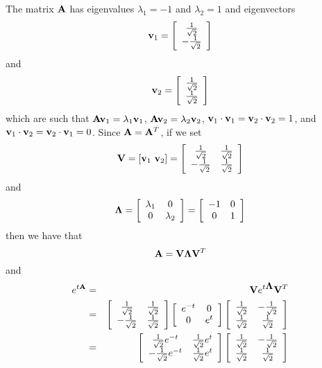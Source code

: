 \begin{solution}
\begin{enumerate}
The matrix ${\bf A}$ has eigenvalues $\lambda_1 = -1$ and $\lambda_2 = 1$ and eigenvectors
\[
{\bf v}_1 = \left[\begin{array}{c}{1\over\sqrt{2}} \\ -{1\over\sqrt{2}}\end{array}\right]
\]
and
\[
{\bf v}_2 = \left[\begin{array}{c}{1\over\sqrt{2}} \\ {1\over\sqrt{2}}\end{array}\right]
\]
which are such that ${\bf A}{\bf v}_1=\lambda_1{\bf v}_1$, ${\bf A}{\bf v}_2=\lambda_2{\bf v}_2$, ${\bf v}_1\cdot{\bf v}_1={\bf v}_2\cdot{\bf v}_2=1$,  and ${\bf v}_1\cdot{\bf v}_2={\bf v}_2\cdot{\bf v}_1=0$. Since ${\bf A}={\bf A}^T$, if we set
\[
\BV = [\Bv_1\ \Bv_2]=\left[\begin{array}{cc}{1\over\sqrt{2}} & {1\over\sqrt{2}} \\ -{1\over\sqrt{2}} & {1\over\sqrt{2}}\end{array}\right]
\]
and
\[
\mbox{\boldmath$\Lambda$} = \left[\begin{array}{cc}\lambda_1 & 0 \\ 0 & \lambda_2\end{array}\right]=\left[\begin{array}{cc}-1 & 0 \\ 0 & 1\end{array}\right]
\]
then we have that
\[
{\bf A} = {\bf V}\mbox{\boldmath$\Lambda$}{\bf V}^T
\]
and
\begin{eqnarray*}
e^{t\BA} &=& \BV e^{t\BLambda} \BV^T
\\
&=& \left[\begin{array}{cc}{1\over\sqrt{2}} & {1\over\sqrt{2}} \\ -{1\over\sqrt{2}} & {1\over\sqrt{2}}\end{array}\right] \left[\begin{array}{cc}e^{-t} & 0 \\ 0 & e^{t}\end{array}\right] \left[\begin{array}{cc}{1\over\sqrt{2}} & -{1\over\sqrt{2}} \\ {1\over\sqrt{2}} & {1\over\sqrt{2}}\end{array}\right]
\\
&=& \left[\begin{array}{cc}{1\over\sqrt{2}}e^{-t} & {1\over\sqrt{2}}e^t \\ -{1\over\sqrt{2}}e^{-t} & {1\over\sqrt{2}}e^t\end{array}\right] \left[\begin{array}{cc}{1\over\sqrt{2}} & -{1\over\sqrt{2}} \\ {1\over\sqrt{2}} & {1\over\sqrt{2}}\end{array}\right]

\end{eqnarray*}
\end{enumerate}
\end{solution}
